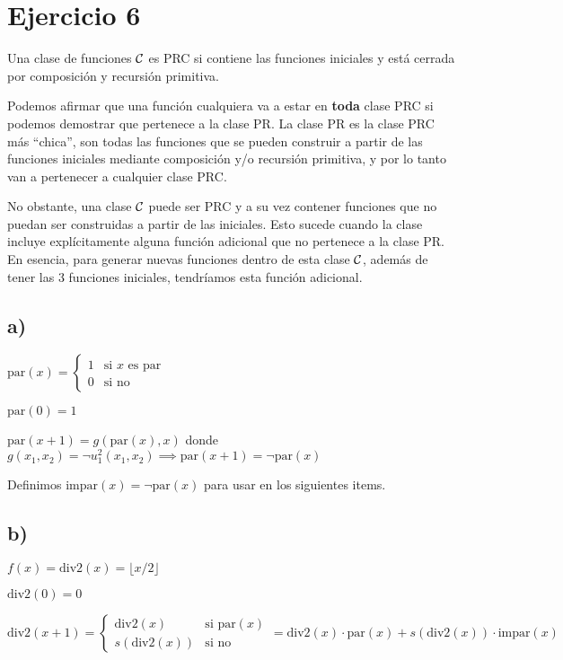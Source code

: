 \section*{Ejercicio 6}

Una clase de funciones $\mathcal{C}$ es PRC si contiene las funciones iniciales y está cerrada por composición y recursión primitiva.

Podemos afirmar que una función cualquiera va a estar en \textbf{toda} clase PRC si podemos demostrar que pertenece a la clase PR. La clase PR es la clase PRC más ``chica'', son todas las funciones que se pueden construir a partir de las funciones iniciales mediante composición y/o recursión primitiva, y por lo tanto van a pertenecer a cualquier clase PRC.

No obstante, una clase $\mathcal{C}$ puede ser PRC y a su vez contener funciones que no puedan ser construidas a partir de las iniciales. Esto sucede cuando la clase incluye explícitamente alguna función adicional que no pertenece a la clase PR. En esencia, para generar nuevas funciones dentro de esta clase $\mathcal{C}$, además de tener las 3 funciones iniciales, tendríamos esta función adicional.

\subsection*{a)}

$\text{par}(x) = \begin{cases}
    1 & \text{si $x$ es par} \\
    0 & \text{si no}
\end{cases}$

$\text{par}(0) = 1$

$\text{par}(x + 1) = g(\text{par}(x), x)$ donde $g(x_1, x_2) = \neg u^2_1(x_1, x_2) \implies \text{par}(x + 1) = \neg \text{par}(x)$

Definimos $\text{impar}(x) = \neg \text{par}(x)$ para usar en los siguientes items.

\subsection*{b)}

$f(x) = \text{div2}(x) = \lfloor x / 2 \rfloor$

$\text{div2}(0) = 0$

$\text{div2}(x + 1) = \begin{cases}
    \text{div2}(x) & \text{si } \text{par}(x) \\
    s(\text{div2}(x)) & \text{si no}
\end{cases} = \text{div2}(x) \cdot \text{par}(x) + s(\text{div2}(x)) \cdot \text{impar}(x)$

